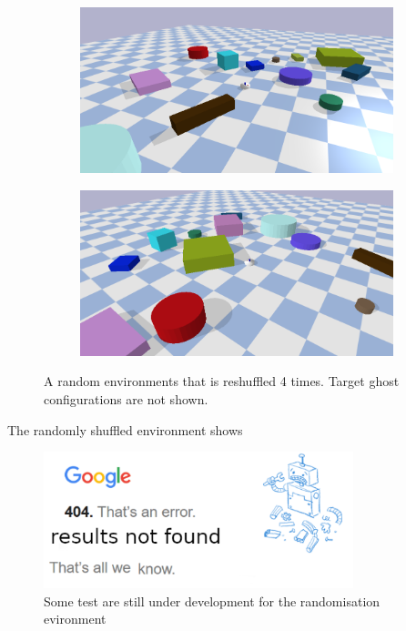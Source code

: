 \begin{figure}[H]
    \vspace{0.2cm}
    \begin{subfigure}{.49\textwidth}
    \includegraphics[width=\textwidth]{figures/tests/random3}
    \end{subfigure}
    \hfill
    \begin{subfigure}{.49\textwidth}
    \centering
    \includegraphics[width=\textwidth]{figures/tests/random4}
    \end{subfigure}
    \caption{A random environments that is reshuffled 4 times. Target ghost configurations are not shown.}
    \label{fig:random_environment_reshuffle}
\end{figure}
The randomly shuffled environment shows 

\begin{figure}[H]
    \centering
    \includegraphics[width=9cm]{figures/tests/404_not_found}
    \caption{Some test are still under development for the randomisation evironment}%
    \label{fig:results_randomisation}
\end{figure}

